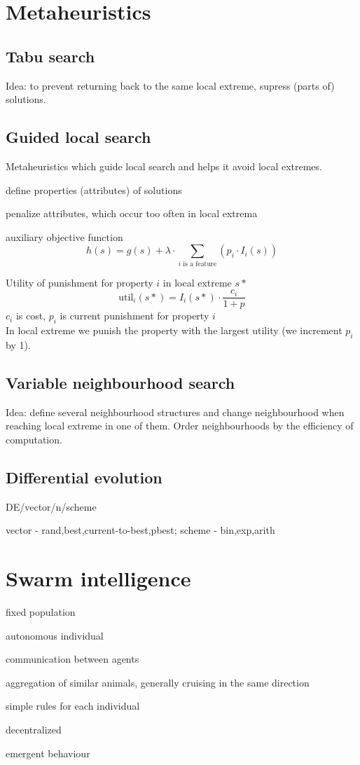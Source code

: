 \documentclass[a4paper]{article}
\begin{document}
\begin{multicols*}{2}
{	\section{Metaheuristics}
	\subsection{Tabu search}
	Idea: to prevent returning back to the same local extreme, supress (parts of) solutions.
	\subsection{Guided local search}
	Metaheuristics which guide local search and helps it avoid local extremes.
	\begin{compactitem}
		\item define properties (attributes) of solutions
		\item penalize attributes, which occur too often in local extrema
		\item auxiliary objective function
		\[h(s) = g(s) + \lambda \cdot \sum_{i\text{ is a feature}}(p_i\cdot I_i(s))\]
	\end{compactitem}
	Utility of punishment for property $i$ in local extreme $s*$
	\[
		\text{util}_i(s*) = I_i(s*) \cdot \frac{c_i}{1+p}
	\]
	$c_i$ is cost, $p_i$ is current punishment for property $i$ \\
	In local extreme we punish the property with the largest utility (we increment $p_i$ by 1).
	\subsection{Variable neighbourhood search}
	Idea: define several neighbourhood structures and change neighbourhood when reaching local extreme
	in one of them. Order neighbourhoods by the efficiency of computation.

	\subsection{Differential evolution}
	DE/vector/n/scheme

	vector - rand,best,current-to-best,pbest; scheme - bin,exp,arith

	\section{Swarm intelligence}
	\begin{compactitem}
		\item fixed population
		\item autonomous individual
		\item communication between agents
		\item aggregation of similar animals, generally cruising in the same direction
		\item simple rules for each individual
		\item decentralized
		\item emergent behaviour
	\end{compactitem}
}
\end{multicols*}
\end{document}
